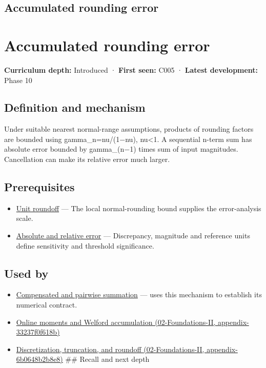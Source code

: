 \hypertarget{appendix-f82e270791c8}{}
\section*{Accumulated rounding error}
\chapter{Accumulated rounding error}\label{appendix-f82e270791c8-accumulated-rounding-error}

\textbf{Curriculum depth:} Introduced · \textbf{First seen:} C005 · \textbf{Latest development:} Phase 10

\section{Definition and mechanism}\label{appendix-f82e270791c8-definition-and-mechanism}

Under suitable nearest normal-range assumptions, products of rounding factors are bounded using gamma\_n=nu/(1−nu), nu\textless1. A sequential n-term sum has absolute error bounded by gamma\_(n−1) times sum of input magnitudes. Cancellation can make its relative error much larger.

\section{Prerequisites}\label{appendix-f82e270791c8-prerequisites}

\begin{itemize}
\tightlist
\item
  \hyperref[appendix-bc44f7b42f42]{Unit roundoff} --- The local normal-rounding bound supplies the error-analysis scale.
\item
  \hyperref[appendix-3ae74e89b4e6]{Absolute and relative error} --- Discrepancy, magnitude and reference units define sensitivity and threshold significance.
\end{itemize}

\section{Used by}\label{appendix-f82e270791c8-used-by}

\begin{itemize}
\item
  \hyperref[appendix-df318da57389]{Compensated and pairwise summation} --- uses this mechanism to establish its numerical contract.
\item
  \href{../02-Foundations-II/main.pdf\#nameddest=appendix-33237f0f618b}{Online moments and Welford accumulation (02-Foundations-II, appendix-33237f0f618b)}
\item
  \href{../02-Foundations-II/main.pdf\#nameddest=appendix-6b0648b2b8e8}{Discretization, truncation, and roundoff (02-Foundations-II, appendix-6b0648b2b8e8)} \#\# Recall and next depth
\end{itemize}

